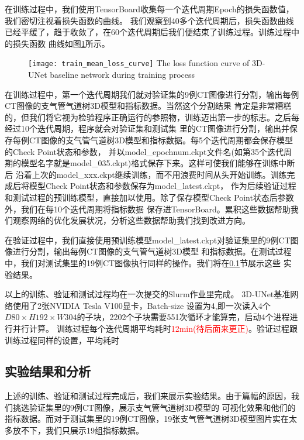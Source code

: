 在训练过程中，我们使用TensorBoard收集每一个迭代周期Epoch的损失函数值，我们密切注视着损失函数的曲线。
我们观察到40多个迭代周期后，损失函数曲线已经平缓了，趋于收敛了，在60个迭代周期后我们便结束了训练过程。训练过程中的损失函数
曲线如图\ref{fig:lossfn_curve}所示。
\begin{figure}[!htp]
    \centering
    \texttt{[image: train\_mean\_loss\_curve]}
        {The loss function curve of 3D-UNet baseline network during training process}
    \label{fig:lossfn_curve}
\end{figure}
在训练过程中，第一个迭代周期我们就对验证集的9例CT图像进行分割，输出每例CT图像的支气管气道树3D模型和指标数据。当然这个分割结果
肯定是非常糟糕的，但我们将它视为检验程序正确运行的参照物，训练迈出第一步的标志。之后每经过10个迭代周期，程序就会对验证集和测试集
里的CT图像进行分割，输出并保存每例CT图像的支气管气道树3D模型和指标数据。每5个迭代周期都会保存模型的Check Point状态和参数，
并以model\_epochnum.ckpt文件名(如第35个迭代周期的模型名字就是model\_035.ckpt)格式保存下来。这样可使我们能够在训练中断后
沿着上次的model\_xxx.ckpt继续训练，而不用浪费时间从头开始训练。训练完成后将模型Check Point状态和参数保存为model\_latest.ckpt，
作为后续验证过程和测试过程的预训练模型，直接加以使用。除了保存模型Check Point状态后参数外，我们在每10个迭代周期将指标数据
保存进TensorBoard。累积这些数据帮助我们观察网络的优化发展状况，分析这些数据帮助我们找到改进方向。

在验证过程中，我们直接使用预训练模型model\_latest.ckpt对验证集里的9例CT图像进行分割，输出每例CT图像的支气管气道树3D模型
和指标数据。在测试过程中，我们对测试集里的19例CT图像执行同样的操作。我们将在\ref{subsec:experiment_results}节展示这些
实验结果。

以上的训练、验证和测试过程均在一次提交的Slurm作业里完成。 3D-UNet基准网络使用了2张NVIDIA Tesla V100显卡，Batch-size
设置为4,即一次读入4个$D80 \times H192 \times W304$的子块，2202个子块需要551次循环才能算完，启动4个进程进行并行计算。
训练过程每个迭代周期平均耗时\textcolor{red}{12min(待后面来更正)}。验证过程跟训练过程同样的设置，平均耗时


\subsection{实验结果和分析}\label{subsec:experiment_results}
上述的训练、验证和测试过程完成后，我们来展示实验结果。由于篇幅的原因，我们挑选验证集里的9例CT图像，展示支气管气道树3D模型的
可视化效果和他们的指标数据。而对于测试集里的19例CT图像，19张支气管气道树3D模型图片实在太多放不下，我们只展示19组指标数据。

